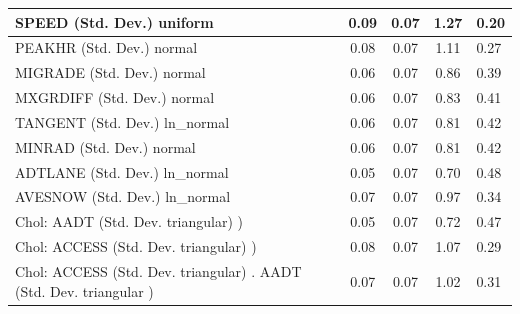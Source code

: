 \begin{table}
\begin{center}
\begin{tabular}{|l|l|c|c|c|l|}
			SPEED (Std. Dev.) uniform &  & 0.09 & 0.07 & 1.27 & 0.20 \\
			\hline
			PEAKHR (Std. Dev.) normal &  & 0.08 & 0.07 & 1.11 & 0.27 \\
			\hline
			MIGRADE (Std. Dev.) normal &  & 0.06 & 0.07 & 0.86 & 0.39 \\
			\hline
			MXGRDIFF (Std. Dev.) normal &  & 0.06 & 0.07 & 0.83 & 0.41 \\
			\hline
			TANGENT (Std. Dev.) ln_normal &  & 0.06 & 0.07 & 0.81 & 0.42 \\
			\hline
			MINRAD (Std. Dev.) normal &  & 0.06 & 0.07 & 0.81 & 0.42 \\
			\hline
			ADTLANE (Std. Dev.) ln_normal &  & 0.05 & 0.07 & 0.70 & 0.48 \\
			\hline
			AVESNOW (Std. Dev.) ln_normal &  & 0.07 & 0.07 & 0.97 & 0.34 \\
			\hline
			 Chol: AADT (Std. Dev. triangular) ) &  & 0.05 & 0.07 & 0.72 & 0.47 \\
			\hline
			 Chol: ACCESS (Std. Dev. triangular) ) &  & 0.08 & 0.07 & 1.07 & 0.29 \\
			\hline
			 Chol: ACCESS (Std. Dev. triangular) . AADT (Std. Dev.   triangular ) &  & 0.07 & 0.07 & 1.02 & 0.31 \\
			\hline
		\end{tabular}
	\end{center}
\end{table}